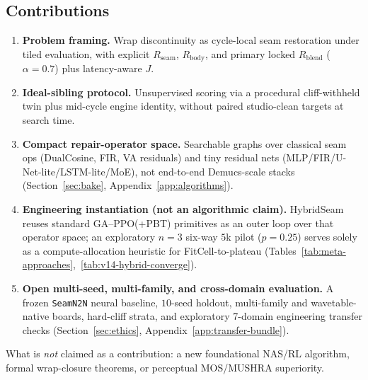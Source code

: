 \subsection{Contributions}
\label{sec:contributions}
\begin{enumerate}
  \item \textbf{Problem framing.} Wrap discontinuity as cycle-local seam restoration under tiled evaluation, with explicit $R_{\mathrm{seam}}$, $R_{\mathrm{body}}$, and primary locked $R_{\mathrm{blend}}$ ($\alpha{=}0.7$) plus latency-aware $J$.
  \item \textbf{Ideal-sibling protocol.} Unsupervised scoring via a procedural cliff-withheld twin plus mid-cycle engine identity, without paired studio-clean targets at search time.
  \item \textbf{Compact repair-operator space.} Searchable graphs over classical seam ops (DualCosine, FIR, VA residuals) and tiny residual nets (MLP/FIR/U-Net-lite/LSTM-lite/MoE), not end-to-end Demucs-scale stacks (Section~\ref{sec:bake}, Appendix~\ref{app:algorithms}).
  \item \textbf{Engineering instantiation (not an algorithmic claim).} HybridSeam reuses standard GA--PPO(+PBT) primitives as an outer loop over that operator space; an exploratory $n{=}3$ six-way $5$k pilot ($p{=}0.25$) serves solely as a compute-allocation heuristic for FitCell-to-plateau (Tables~\ref{tab:meta-approaches},~\ref{tab:v14-hybrid-converge}).
  \item \textbf{Open multi-seed, multi-family, and cross-domain evaluation.} A frozen \texttt{SeamN2N} neural baseline, $10$-seed holdout, multi-family and wavetable-native boards, hard-cliff strata, and exploratory 7-domain engineering transfer checks (Section~\ref{sec:ethics}, Appendix~\ref{app:transfer-bundle}).
\end{enumerate}
What is \emph{not} claimed as a contribution: a new foundational NAS/RL algorithm, formal wrap-closure theorems, or perceptual MOS/MUSHRA superiority.
